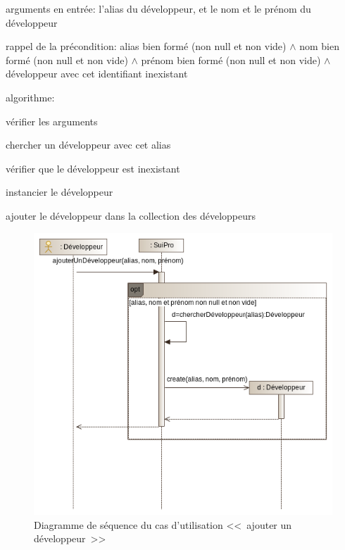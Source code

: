 \documentclass[11pt,article]{article}
\newcommand{\nullvalue}{\textsf{null}\xspace}
\begin{document}
\begin{compactitem}
\item arguments en entrée: l'alias du développeur, et le nom et le
  prénom du développeur
\item rappel de la précondition: alias bien formé (non \nullvalue et
  non vide) $\land$ nom bien formé (non \nullvalue et non vide)
  $\land$ prénom bien formé (non \nullvalue et non vide) $\land$
  développeur avec cet identifiant inexistant
\item algorithme:
\begin{compactenum}
\item vérifier les arguments
\item chercher un développeur avec cet alias
\item vérifier que le développeur est inexistant
\item instancier le développeur
\item ajouter le développeur dans la collection des développeurs
\end{compactenum}
\end{compactitem}

\begin{figure}[ht!]
\begin{center}
\includegraphics[scale=0.6]{./Diagrammes/suipro_uml_diag_seq_ajouter_developpeur}
\caption{Diagramme de séquence du cas d'utilisation <<~ajouter un
  développeur~>>}
\end{center}
\label{umlet_diag_sequence_ajouter_developpeur}
\end{figure}
\end{document}
